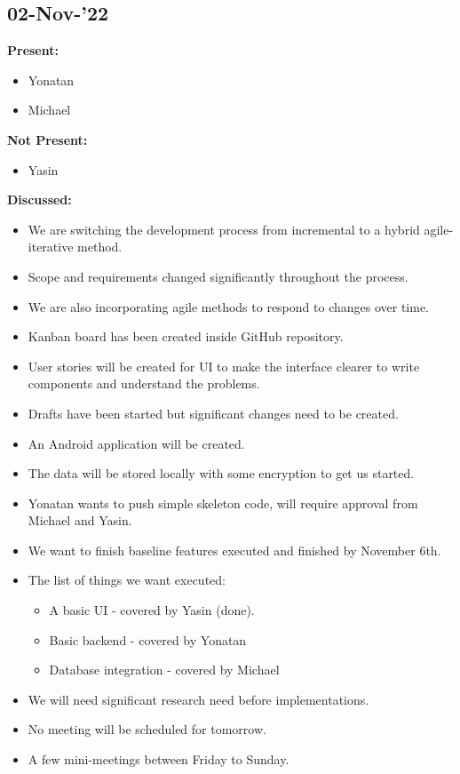 \documentclass[11pt]{article}
\begin{document}
    \subsection{02-Nov-’22}\label{subsec:02-nov-222}

    \textbf{Present:}
    \begin{itemize}
        \item Yonatan
        \item Michael
    \end{itemize}


    \textbf{Not Present:}

    \begin{itemize}
        \item Yasin
    \end{itemize}

    \textbf{Discussed:}
    \begin{itemize}
        \item We are switching the development process from incremental to a hybrid agile-iterative method.
        \item Scope and requirements changed significantly throughout the process.
        \item We are also incorporating agile methods to respond to changes over time.
        \item Kanban board has been created inside GitHub repository.
        \item User stories will be created for UI to make the interface clearer to write components and understand the problems.
        \item Drafts have been started but significant changes need to be created.
        \item An Android application will be created.
        \item The data will be stored locally with some encryption to get us started.
        \item Yonatan wants to push simple skeleton code, will require approval from Michael and Yasin.
        \item We want to finish baseline features executed and finished by November 6th.
        \item The list of things we want executed:
        \begin{itemize}
            \item A basic UI - covered by Yasin (done).
            \item Basic backend - covered by Yonatan
            \item Database integration - covered by Michael
        \end{itemize}
        \item We will need significant research need before implementations.
        \item No meeting will be scheduled for tomorrow.
        \item A few mini-meetings between Friday to Sunday.
    \end{itemize}
\end{document}
